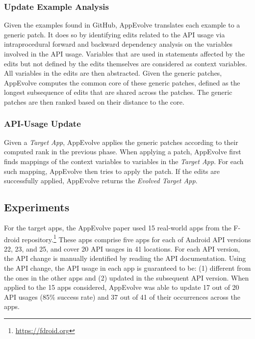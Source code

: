 \subsubsection{Update Example Analysis}
Given the examples found in GitHub, AppEvolve translates each example to a
generic patch. It does so by identifying edits related to the API usage via
intraprocedural forward and backward dependency analysis on the variables
involved in the API usage. Variables that are used in statements affected
by the edits but not defined by the edits themselves are considered as
context variables. All variables in the edits are then abstracted. Given
the generic patches, AppEvolve computes the common core of these generic
patches, defined as the longest subsequence of edits that are shared across
the patches. The generic patches are then ranked based on their distance to
the core.

\subsubsection{API-Usage Update}
Given a {\em Target App}, AppEvolve applies the generic patches according
to their computed rank in the previous phase. When applying a patch,
AppEvolve first finds mappings of the context variables to variables in the
{\em Target App}. For each such mapping, AppEvolve then tries to apply the
patch. If the edits are successfully applied, AppEvolve returns the {\em
  Evolved Target App}.

\subsection{Experiments}
For the target apps, the AppEvolve paper used 15 real-world apps from the
F-droid repository.\footnote{\url{https://fdroid.org}} These apps comprise
five apps for each of Android API versions 22, 23, and 25, and cover 20 API
usages in 41 locations. For each API version, the API change is manually
identified by reading the API documentation. Using the API change, the API
usage in each app is guaranteed to be: (1) different from the ones in the
other apps and (2) updated in the subsequent API version.  When applied to
the 15 apps considered, AppEvolve was able to update 17 out of 20 API
usages (85\% success rate) and 37 out of 41 of their occurrences across the
apps.

